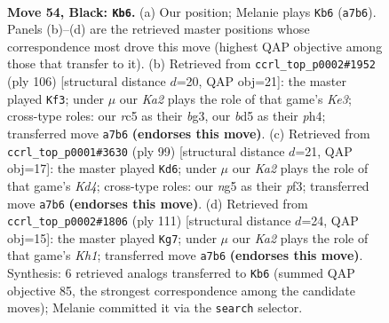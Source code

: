 \documentclass[11pt]{article}
\begin{document}
\clearpage

\begin{figure}[p]\centering
\begin{subfigure}{0.46\textwidth}\centering
\resizebox{\linewidth}{!}{%
\newchessgame
\chessboard[
  setfen={3r4/k7/8/2RB1pNN/1P6/3b4/1K4P1/8 b - - 5 54},
  showmover=false,
  pgfstyle=straightmove, color=movearrow, markmove={a7-b6}
]}
\caption{}
\end{subfigure}\hfill
\begin{subfigure}{0.46\textwidth}\centering
\resizebox{\linewidth}{!}{%
\newchessgame
\chessboard[
  setfen={8/4k3/7R/2pB2r1/2P4p/4K1b1/8/8 w - - 4 54},
  showmover=false,
  pgfstyle=straightmove, color=movearrow, markmove={e3-f3}
]}
\caption{}
\end{subfigure}
\\[4pt]
\begin{subfigure}{0.46\textwidth}\centering
\resizebox{\linewidth}{!}{%
\newchessgame
\chessboard[
  setfen={8/2R5/6p1/3k1b2/8/r3BP2/5P1K/8 b - - 1 50},
  showmover=false,
  pgfstyle=straightmove, color=movearrow, markmove={d5-d6}
]}
\caption{}
\end{subfigure}\hfill
\begin{subfigure}{0.46\textwidth}\centering
\resizebox{\linewidth}{!}{%
\newchessgame
\chessboard[
  setfen={7k/8/5R1p/r4B2/4Pb2/8/2K5/8 b - - 0 56},
  showmover=false,
  pgfstyle=straightmove, color=movearrow, markmove={h8-g7}
]}
\caption{}
\end{subfigure}
\caption{\textbf{Move 54, Black: \texttt{Kb6}.} (a) Our position; Melanie plays \texttt{Kb6} (\texttt{a7b6}). Panels (b)--(d) are the retrieved master positions whose correspondence most drove this move (highest QAP objective among those that transfer to it). (b) Retrieved from \texttt{ccrl\_top\_p0002\#1952} (ply 106) [structural distance $d$=20, QAP obj=21]: the master played \texttt{Kf3}; under $\mu$ our \emph{Ka2} plays the role of that game's \emph{Ke3}; cross-type roles: our \emph{r}c5 as their \emph{b}g3, our \emph{b}d5 as their \emph{p}h4; transferred move \texttt{a7b6} \textbf{(endorses this move)}. (c) Retrieved from \texttt{ccrl\_top\_p0001\#3630} (ply 99) [structural distance $d$=21, QAP obj=17]: the master played \texttt{Kd6}; under $\mu$ our \emph{Ka2} plays the role of that game's \emph{Kd4}; cross-type roles: our \emph{n}g5 as their \emph{p}f3; transferred move \texttt{a7b6} \textbf{(endorses this move)}. (d) Retrieved from \texttt{ccrl\_top\_p0002\#1806} (ply 111) [structural distance $d$=24, QAP obj=15]: the master played \texttt{Kg7}; under $\mu$ our \emph{Ka2} plays the role of that game's \emph{Kh1}; transferred move \texttt{a7b6} \textbf{(endorses this move)}. Synthesis: 6 retrieved analogs transferred to \texttt{Kb6} (summed QAP objective 85, the strongest correspondence among the candidate moves); Melanie committed it via the \texttt{search} selector.}
\label{fig:thought-m107}
\end{figure}
\end{document}
